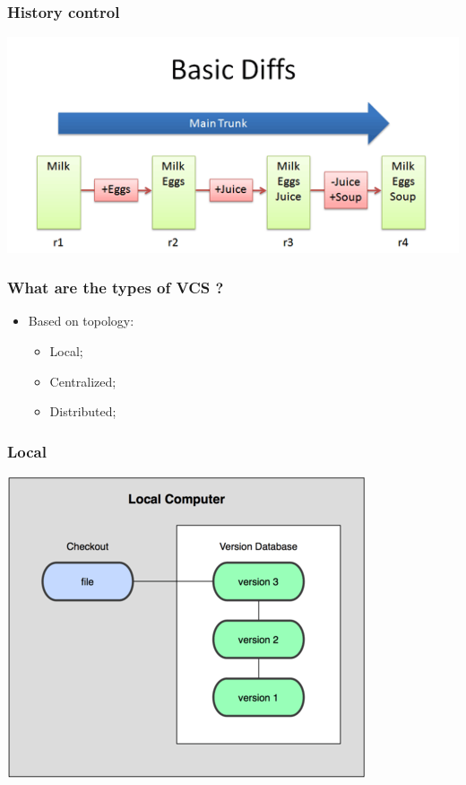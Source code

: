 \documentclass{beamer}
\begin{document}
\begin{frame}
\frametitle{History control}
  \includegraphics[width=1\textwidth]{imgs/04.png}
\end{frame}

\begin{frame}
\frametitle{What are the types of VCS ?}
\begin{itemize}
\item Based on topology:
  \begin{itemize}
  \item Local;
  \item Centralized;
  \item Distributed;
  \end{itemize}
\end{itemize}
\end{frame}

\begin{frame}
\frametitle{Local}
\begin{center}
  \includegraphics[width=\textwidth,height=0.6\textheight,keepaspectratio]{imgs/local.png}
\end{center}
\end{frame}
\end{document}
